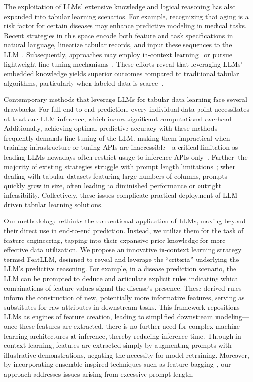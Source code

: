 The exploitation of LLMs’ extensive knowledge and logical reasoning has also expanded into tabular learning scenarios. For example, recognizing that aging is a risk factor for certain diseases may enhance predictive modeling in medical tasks. Recent strategies in this space encode both feature and task specifications in natural language, linearize tabular records, and input these sequences to the LLM~\cite{dinh2022lift,wang2023anypredict}. Subsequently, approaches may employ in-context learning~\cite{nam2023semi} or pursue lightweight fine-tuning mechanisms~\cite{dinh2022lift,hegselmann2023tabllm}. These efforts reveal that leveraging LLMs' embedded knowledge yields superior outcomes compared to traditional tabular algorithms, particularly when labeled data is scarce~\cite{hegselmann2023tabllm}.

Contemporary methods that leverage LLMs for tabular data learning face several drawbacks. For full end-to-end prediction, every individual data point necessitates at least one LLM inference, which incurs significant computational overhead. Additionally, achieving optimal predictive accuracy with these methods frequently demands fine-tuning of the LLM, making them impractical when training infrastructure or tuning APIs are inaccessible—a critical limitation as leading LLMs nowadays often restrict usage to inference APIs only~\cite{anil2023palm,openai2023gpt4}. Further, the majority of existing strategies struggle with prompt length limitations~\cite{liu2023lost}; when dealing with tabular datasets featuring large numbers of columns, prompts quickly grow in size, often leading to diminished performance or outright infeasibility. Collectively, these issues complicate practical deployment of LLM-driven tabular learning solutions.

Our methodology rethinks the conventional application of LLMs, moving beyond their direct use in end-to-end prediction. Instead, we utilize them for the task of feature engineering, tapping into their expansive prior knowledge for more effective data utilization. We propose an innovative in-context learning strategy termed \textsf{FeatLLM}, designed to reveal and leverage the “criteria” underlying the LLM’s predictive reasoning. For example, in a disease prediction scenario, the LLM can be prompted to deduce and articulate explicit rules indicating which combinations of feature values signal the disease’s presence. These derived rules inform the construction of new, potentially more informative features, serving as substitutes for raw attributes in downstream tasks. This framework repositions LLMs as engines of feature creation, leading to simplified downstream modeling—once these features are extracted, there is no further need for complex machine learning architectures at inference, thereby reducing inference time. Through in-context learning, features are extracted simply by augmenting prompts with illustrative demonstrations, negating the necessity for model retraining. Moreover, by incorporating ensemble-inspired techniques such as feature bagging~\cite{breiman2001random}, our approach addresses issues arising from excessive prompt length.


